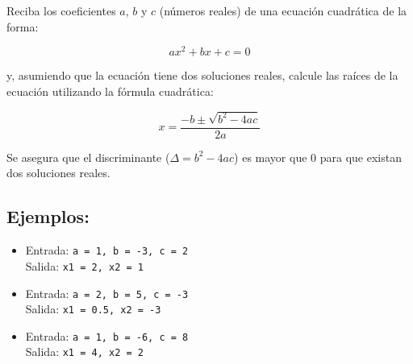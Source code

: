 Reciba los coeficientes \(a\), \(b\) y \(c\) (números reales) de una ecuación cuadrática de la forma:

\[
ax^2 + bx + c = 0
\]

y, asumiendo que la ecuación tiene dos soluciones reales, calcule las raíces de la ecuación utilizando la fórmula cuadrática:

\[
x = \frac{-b \pm \sqrt{b^2 - 4ac}}{2a}
\]

Se asegura que el discriminante (\(\Delta = b^2 - 4ac\)) es mayor que 0 para que existan dos soluciones reales.

\subsection*{Ejemplos:}
\begin{itemize}
    \item Entrada: \texttt{a = 1, b = -3, c = 2}\\
          Salida: \texttt{x1 = 2, x2 = 1}
    \item Entrada: \texttt{a = 2, b = 5, c = -3}\\
          Salida: \texttt{x1 = 0.5, x2 = -3}
    \item Entrada: \texttt{a = 1, b = -6, c = 8}\\
          Salida: \texttt{x1 = 4, x2 = 2}
\end{itemize}

